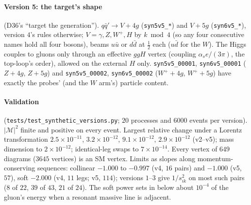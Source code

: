 \documentclass[11pt]{article}
\newcommand{\code}[1]{\texttt{#1}}
\begin{document}
\paragraph{Version 5: the target's shape} (D36's ``target the generation''). $q\bar q'\to V+4g$ (\code{syn5v5\_*}) and
$V+5g$ (\code{syn6v5\_*}), version $4$'s rules otherwise; $V=\gamma,Z,W^+,H$ by $k\bmod4$ (so any four consecutive names
hold all four bosons), beams $u\bar u$ or $d\bar d$ at $\tfrac12$ each ($u\bar d$ for the $W$). The Higgs couples to
gluons only through an effective $ggH$ vertex (coupling $\alpha_s e/(3\pi)$, the top-loop's order), allowed on the
external $H$ only. \code{syn5v5\_00001}, \code{syn6v5\_00001} ($Z+4g$, $Z+5g$) and \code{syn5v5\_00002},
\code{syn6v5\_00002} ($W^++4g$, $W^++5g$) have exactly the probes' (and the $W$ arm's) particle content.
\paragraph{Validation} (\code{tests/test\_synthetic\_versions.py}; $20$ processes and $6000$ events per version).
$|\mathcal M|^2$ finite and positive on every event. Largest relative change under a Lorentz transformation
$2.5\times10^{-11}$, $3.2\times10^{-12}$, $9.1\times10^{-12}$, $2.9\times10^{-12}$ (v2--v5); mass dimension to
$2\times10^{-12}$; identical-leg swaps to $7\times10^{-14}$. Every vertex of $649$ diagrams ($3645$ vertices) is an SM vertex.
Limits as slopes along momentum-conserving sequences: collinear $-1.000$ to $-0.997$ (v4, $16$ pairs) and $-1.000$
(v5, $57$), soft $-2.000$ (v4, $11$ legs; v5, $114$); versions $1$--$3$ give $1/s_{ik}^2$ on most such pairs ($8$ of $22$,
$39$ of $43$, $21$ of $24$). The soft power sets in below about $10^{-4}$ of the gluon's energy when a resonant massive
line is adjacent.
\end{document}
